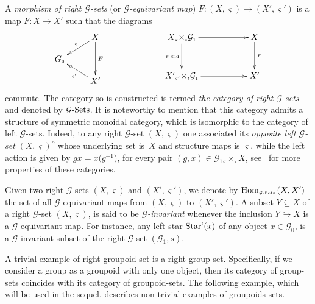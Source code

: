 \documentclass[pdftex]{sigma}
\numberwithin{equation}{section}
\renewcommand{\hom}[3]{\mathrm{Hom}_{\Sscript{#1}}\left(#2, #3\right)}
\newcommand{\Go}{\cG_{\Sscript{0}}}
\newcommand{\Ga}{\cG_{\Sscript{1}}}
\newcommand{\Starl}[1]{{{\rm Star}}^{\Sscript{l}}(#1)}
\newcommand{\cG}{{\mathcal G}}
\newcommand{\Gsets}{\cG\text{-}{\rm Sets}}
\newcommand{\Sscript}[1]{\scriptscriptstyle{#1}}
\newcommand{\due}[3]{{}_{{#2 }} {#1}_{{ #3}} }
\begin{document}
A \emph{morphism of right $\cG$-sets} (or \emph{$\cG$-equivariant map}) $F\colon (X,\varsigma) \to (X',\varsigma')$ is a map $F\colon X \to X'$ such that the diagrams
\begin{gather}
\begin{gathered}
\xymatrix@R=12pt{ & X \ar@{->}_-{\Sscript{\varsigma}}[ld]
\ar@{->}^-{F}[dd] & \\ G_{\Sscript{0}}& & \\ & X'
\ar@{->}^-{\Sscript{\varsigma'}}[lu] & } \qquad \qquad
\xymatrix@R=12pt{X \due \times {\Sscript{\varsigma}} {
\Sscript{t}} \Ga \ar@{->}^-{}[rr] \ar@{->}_-{\Sscript{F \times
 {\rm id}}}[dd] & & X \ar@{->}^-{\Sscript{F}}[dd] \\ & & \\ X' \due
\times {\Sscript{\varsigma'}} { \Sscript{t}} \Ga
\ar@{->}^-{}[rr] & & X' }
\end{gathered}
\end{gather}
commute. The category so is constructed is termed \emph{the category of right $\cG$-sets} and denoted by $\Gsets$. It is noteworthy to mention that this category admits a structure of symmetric monoidal category, which is isomorphic to the category of left $\cG$-sets. Indeed, to any right $\cG$-set $(X,\varsigma)$ one associated its \emph{opposite left $\cG$-set} $(X, \varsigma)^{\Sscript{o}}$ whose underlying set is~$X$ and structure maps is $\varsigma$, while the left action is given by $g x = x\big(g^{-1}\big)$, for every pair $(g, x) \in \Ga \due \times {\Sscript{s}} { \Sscript{\varsigma}} X$, see~\cite{Kaoutit/Kowalzig:14} for more properties of these categories.

Given two right $\cG$-sets $(X,\varsigma)$ and $(X',\varsigma')$, we denote by $\hom{\Gsets}{X}{X'}$ the set of all $\cG$-equivariant maps from $(X,\varsigma)$ to $(X',\varsigma')$. A subset $Y \subseteq X$ of a right $\cG$-set $(X,\varsigma)$, is said to be \emph{$\cG$-invariant} whenever the inclusion $Y \hookrightarrow X$ is a $\cG$-equivariant map. For instance, any left star $\Starl{x}$ of any object $x \in\Go$, is a $\cG$-invariant subset of the right $\cG$-set $(\Ga, s)$.

A trivial example of right groupoid-set is a right group-set. Specifically, if we consider a group as a groupoid with only one object, then its category of group-sets coincides with its category of groupoid-sets. The following example, which will be used in the sequel, describes non trivial examples of groupoids-sets.
\end{document}
